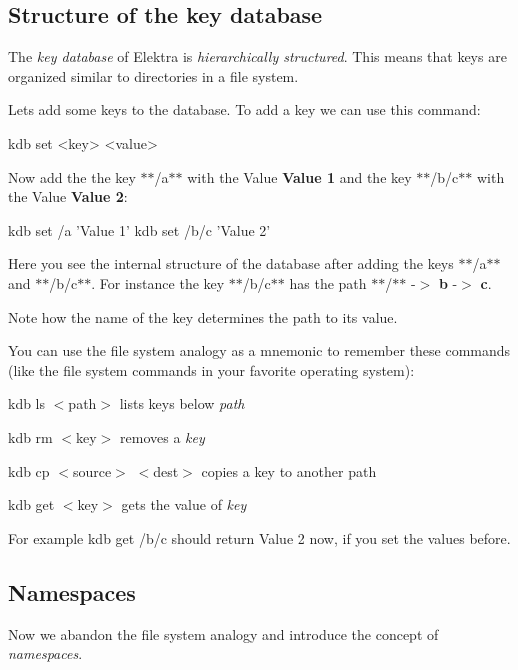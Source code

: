 \subsection*{Structure of the key database}

The {\itshape key database} of Elektra is {\itshape hierarchically structured}. This means that keys are organized similar to directories in a file system.

Lets add some keys to the database. To add a key we can use this command\+: \begin{DoxyVerb}    kdb set <key> <value>
\end{DoxyVerb}


Now add the the key $\ast$$\ast$/a$\ast$$\ast$ with the Value {\bfseries Value 1} and the key $\ast$$\ast$/b/c$\ast$$\ast$ with the Value {\bfseries Value 2}\+: \begin{DoxyVerb}    kdb set /a 'Value 1'
    kdb set /b/c 'Value 2'
\end{DoxyVerb}


 Here you see the internal structure of the database after adding the keys $\ast$$\ast$/a$\ast$$\ast$ and $\ast$$\ast$/b/c$\ast$$\ast$. For instance the key $\ast$$\ast$/b/c$\ast$$\ast$ has the path $\ast$$\ast$/$\ast$$\ast$ -\/$>$ {\bfseries b} -\/$>$ {\bfseries c}.

Note how the name of the key determines the path to its value.

You can use the file system analogy as a mnemonic to remember these commands (like the file system commands in your favorite operating system)\+:
\begin{DoxyItemize}
\item {\ttfamily kdb ls $<$path$>$} lists keys below {\itshape path}
\item {\ttfamily kdb rm $<$key$>$} removes a {\itshape key}
\item {\ttfamily kdb cp $<$source$>$ $<$dest$>$} copies a key to another path
\item {\ttfamily kdb get $<$key$>$} gets the value of {\itshape key}
\end{DoxyItemize}

For example {\ttfamily kdb get /b/c} should return {\ttfamily Value 2} now, if you set the values before.

\subsection*{Namespaces}

Now we abandon the file system analogy and introduce the concept of {\itshape namespaces}.

